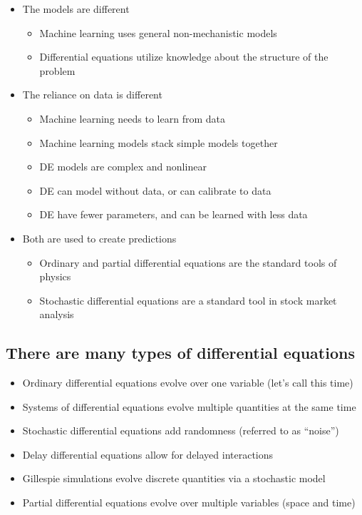 \documentclass[11pt]{article}
\begin{document}
\begin{itemize}
\itemsep1pt\parskip0pt
\item
  The models are different

  \begin{itemize}
  \itemsep1pt\parskip0pt
  \item
    Machine learning uses general non-mechanistic models
  \item
    Differential equations utilize knowledge about the structure of the
    problem
  \end{itemize}
\item
  The reliance on data is different

  \begin{itemize}
  \itemsep1pt\parskip0pt
  \item
    Machine learning needs to learn from data
  \item
    Machine learning models stack simple models together
  \item
    DE models are complex and nonlinear
  \item
    DE can model without data, or can calibrate to data
  \item
    DE have fewer parameters, and can be learned with less data
  \end{itemize}
\item
  Both are used to create predictions

  \begin{itemize}
  \itemsep1pt\parskip0pt
  \item
    Ordinary and partial differential equations are the standard tools
    of physics
  \item
    Stochastic differential equations are a standard tool in stock
    market analysis
  \end{itemize}
\end{itemize}

    \subsection{There are many types of differential
equations}\label{there-are-many-types-of-differential-equations}

\begin{itemize}
\itemsep1pt\parskip0pt
\item
  Ordinary differential equations evolve over one variable (let's call
  this time)
\item
  Systems of differential equations evolve multiple quantities at the
  same time
\item
  Stochastic differential equations add randomness (referred to as
  ``noise'')
\item
  Delay differential equations allow for delayed interactions
\item
  Gillespie simulations evolve discrete quantities via a stochastic
  model
\item
  Partial differential equations evolve over multiple variables (space
  and time)
\end{itemize}
\end{document}
